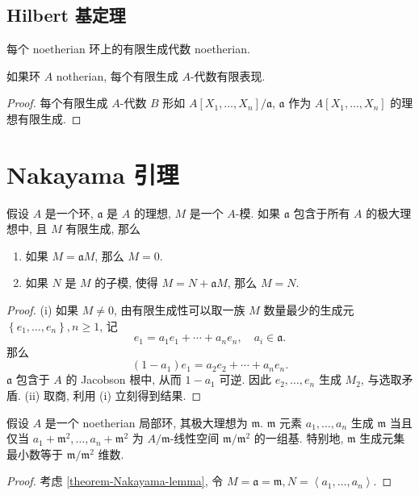 \subsection{Hilbert 基定理}

\begin{theorem}[Hilbert基]
  每个 noetherian 环上的有限生成代数 noetherian.
\end{theorem}

\begin{corollary}
  如果环 \( A \) notherian, 每个有限生成 \( A \)-代数有限表现.
\end{corollary}
\begin{proof}
  每个有限生成 \( A \)-代数 \( B \) 形如 \( A[X_1, \ldots, X_n] / \mathfrak{a}
  \), \( \mathfrak{a} \) 作为 \( A[X_1, \ldots, X_n] \) 的理想有限生成.
\end{proof}

\section{Nakayama 引理}

\begin{theorem}[Nakayama引理]
  \label{theorem-Nakayama-lemma}
  假设 \( A \) 是一个环, \( \mathfrak{a} \) 是 \( A \) 的理想, \( M \) 是一个 \(
  A\)-模. 如果 \( \mathfrak{a} \) 包含于所有 \( A \) 的极大理想中, 且 \( M \)
  有限生成, 那么
  \begin{enumerate}
    \item 如果 \( M = \mathfrak{a} M \), 那么 \( M = 0 \).
    \item 如果 \( N \) 是 \( M \) 的子模, 使得 \( M = N + \mathfrak{a} M \),
      那么 \( M = N \).
  \end{enumerate}
\end{theorem}
\begin{proof}
  (i) 如果 \( M \neq 0 \), 由有限生成性可以取一族 \( M \) 数量最少的生成元 \(
  \left\lbrace e_1, \ldots, e_n \right\rbrace, n \geq 1 \), 记
  \[
    e_1 = a_1 e_1 + \cdots + a_n e_n,\quad a_i \in \mathfrak{a}.
  \]
  那么
  \[
    (1 - a_1) e_1 = a_2 e_2 + \cdots + a_n e_n.
  \]
  \( \mathfrak{a} \) 包含于 \( A \) 的 Jacobson 根中, 从而 \( 1 - a_1 \) 可逆.
  因此 \( e_2, \ldots, e_n \) 生成 \( M_2 \), 与选取矛盾. (ii) 取商, 利用 (i)
  立刻得到结果.
\end{proof}

\begin{corollary}
  假设 \( A \) 是一个 noetherian 局部环, 其极大理想为 \( \mathfrak{m} \). \(
  \mathfrak{m} \) 元素 \( a_1, \ldots, a_n \) 生成 \( \mathfrak{m} \) 当且仅当
  \( a_1 + \mathfrak{m}^2,\ldots, a_n + \mathfrak{m}^{2} \) 为 \( A /
  \mathfrak{m} \)-线性空间 \( \mathfrak{m} / \mathfrak{m}^2 \) 的一组基. 特别地,
  \( \mathfrak{m} \) 生成元集最小数等于 \( \mathfrak{m} / \mathfrak{m}^2 \)
  维数.
\end{corollary}
\begin{proof}
  考虑 \cref{theorem-Nakayama-lemma}, 令 \( M = \mathfrak{a} = \mathfrak{m},
  N = \left\langle a_1, \ldots, a_n \right\rangle \).
\end{proof}

